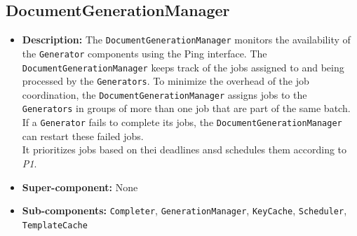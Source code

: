 \documentclass[a4paper,10pt]{article}
\begin{document}
\subsection{DocumentGenerationManager}
\begin{itemize}
    \item \textbf{Description:} The \texttt{DocumentGenerationManager} monitors the availability of the \texttt{Generator} components using the Ping interface. The \texttt{DocumentGenerationManager} keeps track of the jobs assigned to and being processed by the \texttt{Generators}. To minimize the overhead of the job coordination, the \texttt{DocumentGenerationManager} assigns jobs to the \texttt{Generators} in groups of more than one job that are part of the same batch. If a \texttt{Generator} fails to complete its jobs, the \texttt{DocumentGenerationManager} can restart these failed jobs. \\ It prioritizes jobs based on thei deadlines ansd schedules them according to \emph{P1}.
    \item \textbf{Super-component:} None
    \item \textbf{Sub-components:} \texttt{Completer}, \texttt{GenerationManager}, \texttt{KeyCache}, \texttt{Scheduler}, \texttt{TemplateCache}
\end{itemize}
\end{document}
